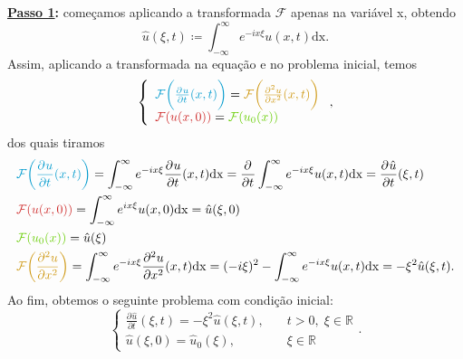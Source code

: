 \documentclass[../pde_notes.tex]{subfiles}
\begin{document}
\textbf{\underline{Passo 1}:} começamos aplicando a transformada \(\mathcal{F}\) apenas na variável x, obtendo
\[
	\hat{u}(\xi , t)\coloneqq \int_{-\infty}^{\infty}e^{-ix\xi }u(x, t) \mathrm{dx}.
\]
Assim, aplicando a transformada na equação e no problema inicial, temos
\[
	\left\{\begin{array}{ll}
		{\color{DeepSkyBlue3}\mathcal{F}\biggl(\frac{\partial^{}u}{\partial t^{}}(x, t)\biggr)} = {\color{DarkGoldenrod3}\mathcal{F}\biggl(\frac{\partial^{2}u}{\partial x^{2}}(x, t)\biggr)} \\
		{\color{Firebrick3}\mathcal{F}(u(x, 0))} = {\color{Chartreuse3}\mathcal{F}(u_{0}(x))}
	\end{array}\right.,
\]
dos quais tiramos
\begin{align*}
	 & {\color{DeepSkyBlue3} \mathcal{F}\biggl(\frac{\partial^{}u}{\partial t^{}}(x, t)\biggr)} = \int_{-\infty}^{\infty}e^{-ix\xi }\frac{\partial^{}u}{\partial t^{}}(x, t) \mathrm{dx} = \frac{\partial^{}}{\partial t^{}}\int_{-\infty}^{\infty}e^{-ix\xi }u(x, t) \mathrm{dx} = \frac{\partial^{}\hat{u}}{\partial t^{}}(\xi , t) \\
	 & {\color{Firebrick3} \mathcal{F}(u(x, 0))} = \int_{-\infty}^{\infty}e^{ix\xi }u(x, 0) \mathrm{dx} = \hat{u}(\xi, 0)                                                                                                                                                                                                             \\
	 & {\color{Chartreuse3}\mathcal{F}(u_{0}(x))} = \hat{u}(\xi )                                                                                                                                                                                                                                                                     \\
	 & {\color{DarkGoldenrod3}\mathcal{F}\biggl(\frac{\partial^{2}u}{\partial x^{2}}\biggr)} = \int_{-\infty}^{\infty}e^{-ix\xi }\frac{\partial^{2}u}{\partial x^{2}}(x, t) \mathrm{dx} = (-i\xi )^{2} - \int_{-\infty}^{\infty}e^{-ix\xi }u(x, t) \mathrm{dx} = -\xi^{2}\hat{u}(\xi , t).
\end{align*}
Ao fim, obtemos o seguinte problema com condição inicial:
\[
	\left\{\begin{array}{ll}
		\frac{\partial^{}\hat{u}}{\partial t^{}}(\xi , t) = -\xi^{2}\hat{u}(\xi , t), & \quad t>0,\; \xi \in \mathbb{R} \\
		\hat{u}(\xi , 0) = \hat{u}_{0}(\xi ),                                         & \quad \xi \in \mathbb{R}
	\end{array}\right..
\]
\end{document}
